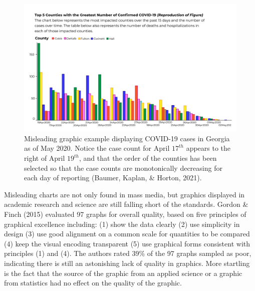 \documentclass[print]{nuthesis}
\begin{document}
\begin{figure}[tbp]

{\centering \includegraphics[width=1\linewidth,]{images/covid-ga-recreation} 

}

\caption[COVID-19 reporting]{Misleading graphic example displaying COVID-19 cases in Georgia as of May 2020. Notice the case count for April $17^{th}$ appears to the right of April $19^{th}$, and that the order of the counties has been selected so that the case counts are monotonically decreasing for each day of reporting (Baumer, Kaplan, \& Horton, 2021).}\label{fig:covid-19-reporting}
\end{figure}

Misleading charts are not only found in mass media, but graphics displayed in academic research and science are still falling short of the standards. Gordon \& Finch (2015) evaluated 97 graphs for overall quality, based on five principles of graphical excellence including: (1) show the data clearly (2) use simplicity in design (3) use good alignment on a common scale for quantities to be compared (4) keep the visual encoding transparent (5) use graphical forms consistent with principles (1) and (4).
The authors rated 39\% of the 97 graphs sampled as poor, indicating there is still an astonishing lack of quality in graphics.
More startling is the fact that the source of the graphic from an applied science or a graphic from statistics had no effect on the quality of the graphic.
\end{document}
